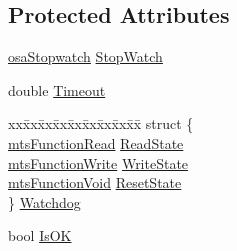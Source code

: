 \subsection*{Protected Attributes}
\begin{DoxyCompactItemize}
\item 
\hyperlink{classosa_stopwatch}{osa\-Stopwatch} \hyperlink{classmts_watchdog_client_a7134855f92deda11544de3f656214b97}{Stop\-Watch}
\item 
double \hyperlink{classmts_watchdog_client_a171e1861b979c9fa2078dba0550a11aa}{Timeout}
\item 
\begin{tabbing}
xx\=xx\=xx\=xx\=xx\=xx\=xx\=xx\=xx\=\kill
struct \{\\
\>\hyperlink{classmts_function_read}{mtsFunctionRead} \hyperlink{classmts_watchdog_client_acd0a87b90a1b5fe3223ad0ff3763a5ce}{ReadState}\\
\>\hyperlink{classmts_function_write}{mtsFunctionWrite} \hyperlink{classmts_watchdog_client_a2ea664a49adbdd5667624efef40044f8}{WriteState}\\
\>\hyperlink{classmts_function_void}{mtsFunctionVoid} \hyperlink{classmts_watchdog_client_a6b68f1baa38cccde6ff0f0cd86dbd637}{ResetState}\\
\} \hyperlink{classmts_watchdog_client_af55c113ae1a80c6840a9617a8ef21f3b}{Watchdog}\\

\end{tabbing}\item 
bool \hyperlink{classmts_watchdog_client_ad5565b3563034efe51b86229bab6bbed}{Is\-O\-K}
\end{DoxyCompactItemize}


